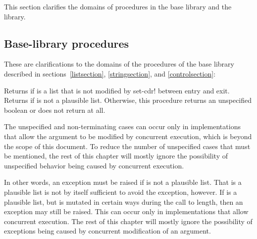 This section clarifies the domains of procedures in the base
library and the  library.

\subsection{Base-library procedures}

These are clarifications to the domains of the procedures of the base
library described in sections~\ref{listsection}, \ref{stringsection},
and \ref{controlsection}:

\begin{entry}{%
}

Returns \schtrue{} if  is a list that is not modified
by {\cf set-cdr!} between entry and exit.
Returns \schfalse{} if  is not a plausible list.
Otherwise, this procedure returns an unspecified boolean
or does not return at all.

\begin{note}
The unspecified and non-terminating cases can occur only
in implementations that allow the argument to be modified
by concurrent execution, which is beyond the scope of this
document.
To reduce the number of unspecified cases that must be
mentioned, the rest of this chapter will mostly ignore
the possibility of unspecified behavior being caused by
concurrent execution.
\end{note}
\end{entry}

\begin{entry}{%
}

\begin{note}
In other words, an exception must be raised if 
is not a plausible list.
That  is a plausible list is not by
itself sufficient to avoid the exception, however.
If  is a plausible list, but is
mutated in certain ways during the call to {\cf length},
then an exception may still be raised.
This can occur only in implementations that allow
concurrent execution.  The rest of this chapter
will mostly ignore the possibility of exceptions being
caused by concurrent modification of an argument.
\end{note}
\end{entry}

\begin{entry}{%
}

\end{entry}

